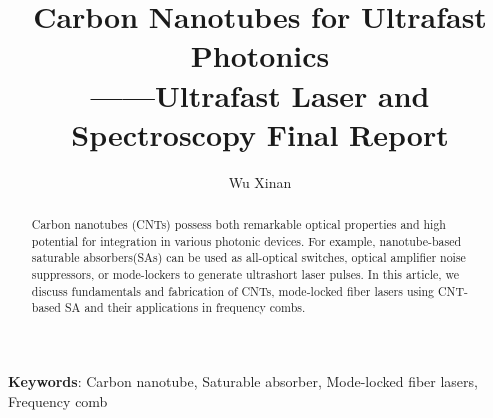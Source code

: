 \documentclass{phyasgn}\usepackage{nag}
\title{
  {Carbon Nanotubes for Ultrafast Photonics}\\[-8pt]
  {\normalsize ——Ultrafast Laser and Spectroscopy Final Report}
}
\author{Wu Xinan}
\date{}
\newcommand\keywords[1]{\textbf{Keywords}: #1}
\begin{document}
\maketitle

\begin{abstract}
\vspace{-1.3em}
 Carbon nanotubes (CNTs) possess both remarkable optical properties and high potential for integration in various photonic devices. For example, nanotube-based saturable absorbers(SAs) can be used as all-optical switches, optical amplifier noise suppressors, or mode-lockers to generate ultrashort laser pulses. In this article, we discuss fundamentals and fabrication of CNTs, mode-locked fiber lasers using CNT-based SA and their applications in frequency combs.
\end{abstract}
\keywords{Carbon nanotube, Saturable absorber, Mode-locked fiber lasers, Frequency comb}
\tableofcontents
\end{document}
